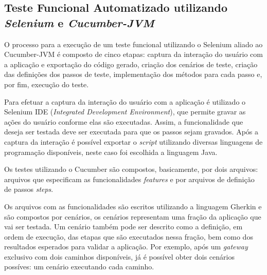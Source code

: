 \documentclass[12pt]{article}
\begin{document}


\subsection{Teste Funcional Automatizado utilizando \emph{Selenium} e \emph{Cucumber-JVM}}
O processo para a execução de um teste funcional utilizando o Selenium aliado ao Cucumber-JVM é composto de cinco etapas: captura da interação do usuário com a aplicação e exportação do código gerado, criação dos cenários de teste, criação das definições dos passos de teste, implementação dos métodos para cada passo e, por fim, execução do teste.

Para efetuar a captura da interação do usuário com a aplicação é utilizado o Selenium IDE (\emph{Integrated Development Environment}), que permite gravar as ações do usuário conforme elas são executadas. Assim, a funcionalidade que deseja ser testada deve ser executada para que os passos sejam gravados. Após a captura da interação é possível exportar o \emph{script} utilizando diversas linguagens de programação disponíveis, neste caso foi escolhida a linguagem Java.

Os testes utilizando o Cucumber são compostos, basicamente, por dois arquivos: arquivos que especificam as funcionalidades \emph{features} e por arquivos de definição de passos \emph{steps}. 

Os arquivos com as funcionalidades são escritos utilizando a linguagem Gherkin\cite{gherkin} e são compostos por cenários, os cenários representam uma fração da aplicação que vai ser testada. Um cenário também pode ser descrito como a definição, em ordem de execução, das etapas que são executados nessa fração, bem como dos resultados esperados para validar a aplicação. Por exemplo, após um \emph{gateway} exclusivo com dois caminhos disponíveis, já é possível obter dois cenários possíves: um cenário executando cada caminho.
\end{document}
